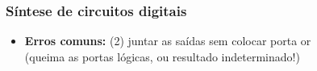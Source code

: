 \documentclass{beamer}
\begin{document}
\begin{frame}
\frametitle{Síntese de circuitos digitais}

\begin{itemize}
\item \textbf{Erros comuns: } (2) juntar as saídas sem colocar porta or\\
(queima as portas lógicas, ou resultado indeterminado!)
\end{itemize}

\begin{center}
%
%
\end{center}

\end{frame}

\end{document}
